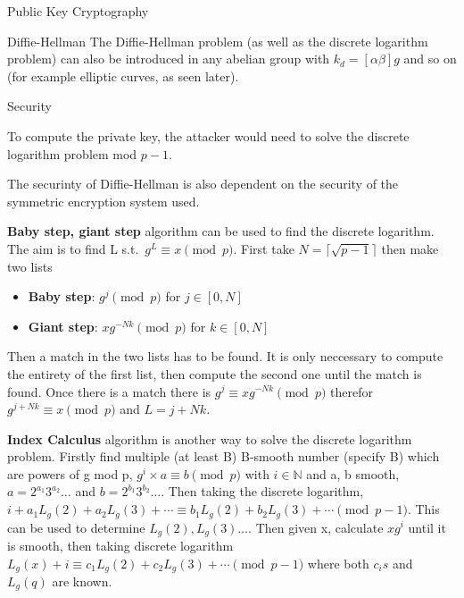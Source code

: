 \documentclass[12pt, letterpaper]{article}
\begin{document}
\begin{section}{Public Key Cryptography}
\begin{subsection}{Diffie-Hellman}
    The Diffie-Hellman problem (as well as the discrete logarithm problem) can
    also be introduced in any abelian group with \(k_{d} = [\alpha \beta] g\)
    and so on (for example elliptic curves, as seen later).

    \begin{subsubsection}{Security}

      To compute the private key, the attacker would need to solve the discrete
      logarithm problem mod \(p - 1\).

      The securinty of Diffie-Hellman is also dependent on the security of the
      symmetric encryption system used.

      \textbf{Baby step, giant step}
      algorithm can be used to find the discrete logarithm. The aim is to find
      L s.t.\ \(g^{L} \equiv x \pmod{p}\).
      First take \(N = \lceil \sqrt{p - 1} \rceil\) then make two lists
      \begin{itemize}
        \item \textbf{Baby step}: \(g^{j} \pmod{p}\) for \(j \in [0, N]\)
        \item \textbf{Giant step}: \(xg^{-Nk} \pmod{p}\) for \(k \in [0, N]\)
      \end{itemize}
      Then a match in the two lists has to be found. It is only neccessary to
      compute the entirety of the first list, then compute the second one until
      the match is found. Once there is a match there is \(g^{j} \equiv
      xg^{-Nk} \pmod{p}\) therefor \(g^{j + Nk} \equiv x \pmod{p}\) and
      \(L = j + Nk\).

      \textbf{Index Calculus}
      algorithm is another way to solve the discrete logarithm problem. Firstly
      find multiple (at least B)  B-smooth number (specify B) which are
      powers of g mod p, \(g^{i} \times a \equiv b \pmod{p}\) with \(i \in
      \mathbb{N}\) and a, b smooth, \(a = 2^{a_{1}} 3^{a_{2}} \dots\) and
      \(b = 2^{b_{1}} 3^{b_{2}} \dots\). Then taking the discrete logarithm,
      \(i + a_{1} L_{g}(2) + a_{2} L_{g}(3) + \cdots \equiv b_{1} L_{g}(2) +
      b_{2} L_{g}(3) + \cdots \pmod{p - 1}\). This can be used to determine
      \(L_{g}(2), L_{g}(3) \dots\). Then given x, calculate \(xg^{i}\) until it
      is smooth, then taking discrete logarithm
      \(L_{g}(x) + i \equiv c_{1} L_{g}(2) + c_{2} L_{g}(3) + \cdots \pmod{p - 1}\)
      where both \(c_{i}s\) and \(L_{g}(q)\) are known.

    \end{subsubsection}


\end{subsection}
\end{section}
\end{document}
